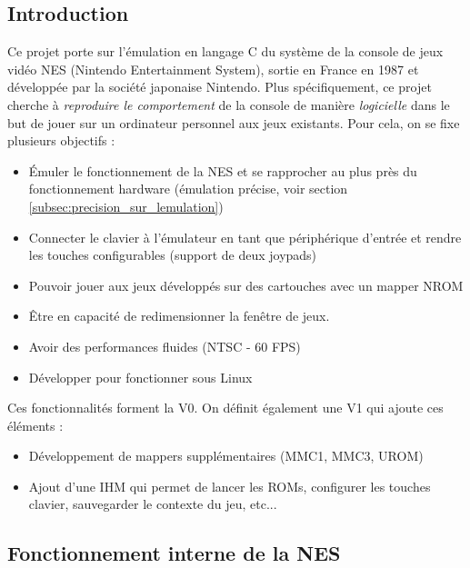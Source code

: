 \subsection{Introduction}

Ce projet porte sur l'émulation en langage C du système de la console de jeux vidéo NES (Nintendo Entertainment System), sortie en France en 1987 et développée par la société japonaise Nintendo. Plus spécifiquement, ce projet cherche à \emph{reproduire le comportement} de la console de manière \emph{logicielle} dans le but de jouer sur un ordinateur personnel aux jeux existants. Pour cela, on se fixe plusieurs objectifs :
\begin{itemize}
  \item Émuler le fonctionnement de la NES et se rapprocher au plus près du fonctionnement hardware (émulation précise, voir section \ref{subsec:precision_sur_lemulation})
  \item Connecter le clavier à l'émulateur en tant que périphérique d'entrée et rendre les touches configurables (support de deux joypads)
  \item Pouvoir jouer aux jeux développés sur des cartouches avec un mapper NROM
  \item Être en capacité de redimensionner la fenêtre de jeux.
  \item Avoir des performances fluides (NTSC - 60 FPS)
  \item Développer pour fonctionner sous Linux
\end{itemize}

\hspace{-6mm}Ces fonctionnalités forment la V0. On définit également une V1 qui ajoute ces éléments :

\begin{itemize}
  \item Développement de mappers supplémentaires (MMC1, MMC3, UROM)
  \item Ajout d'une IHM qui permet de lancer les ROMs, configurer les touches clavier, sauvegarder le contexte du jeu, etc...
\end{itemize}

\subsection{Fonctionnement interne de la NES}
\label{subsec:fonctionnement_interne_nes}

